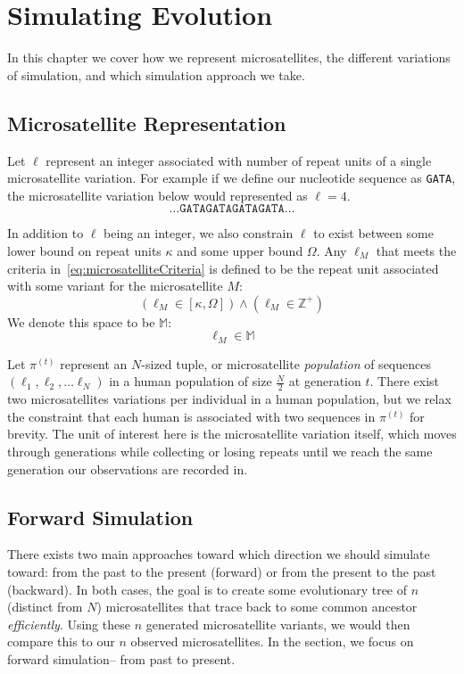 \chapter{Simulating Evolution}\label{ch:simulatingEvolution}
In this chapter we cover how we represent microsatellites, the different variations of simulation,
and which simulation approach we take.

\section{Microsatellite Representation}\label{sec:microsatelliteRepresentation}
Let $\ell$ represent an integer associated with number of repeat units of a single microsatellite variation.
For example if we define our nucleotide sequence as \texttt{GATA}, the microsatellite variation below would represented
as $\ell=4$.
\begin{equation*}
    \ldots \texttt{GATAGATAGATAGATA} \ldots
\end{equation*}

In addition to $\ell$ being an integer, we also constrain $\ell$ to exist between some lower bound on repeat units
$\kappa$ and some upper bound $\Omega$.
Any $\ell_M$ that meets the criteria in~\autoref{eq:microsatelliteCriteria} is defined to be the repeat unit
associated with some variant for the microsatellite $M$:
\begin{equation}\label{eq:microsatelliteCriteria}
    \left(\ell_M \in [\kappa, \Omega]\right) \land \left(\ell_M \in \mathbb{Z}^+\right)
\end{equation}
We denote this space to be $\mathbb{M}$:
\begin{equation}
    \ell_M \in \mathbb{M}
\end{equation}

Let $\pi^{(t)}$ represent an $N$-sized tuple, or microsatellite \emph{population} of sequences
$\left(\ell_1, \ell_2, \ldots \ell_{N}\right)$ in a human population of size $\frac{N}{2}$ at generation $t$.
There exist two microsatellites variations per individual in a human population, but we relax the constraint that
each human is associated with two sequences in $\pi^{(t)}$ for brevity.
The unit of interest here is the microsatellite variation itself, which moves through generations while collecting or
losing repeats until we reach the same generation our observations are recorded in.

\section{Forward Simulation}\label{sec:forwardSimulation}
There exists two main approaches toward which direction we should simulate toward: from the past to the present
(forward) or from the present to the past (backward).
In both cases, the goal is to create some evolutionary tree of $n$ (distinct from $N$) microsatellites that trace back
to some common ancestor \emph{efficiently}.
Using these $n$ generated microsatellite variants, we would then compare this to our $n$ observed microsatellites.
In the section, we focus on forward simulation-- from past to present.

